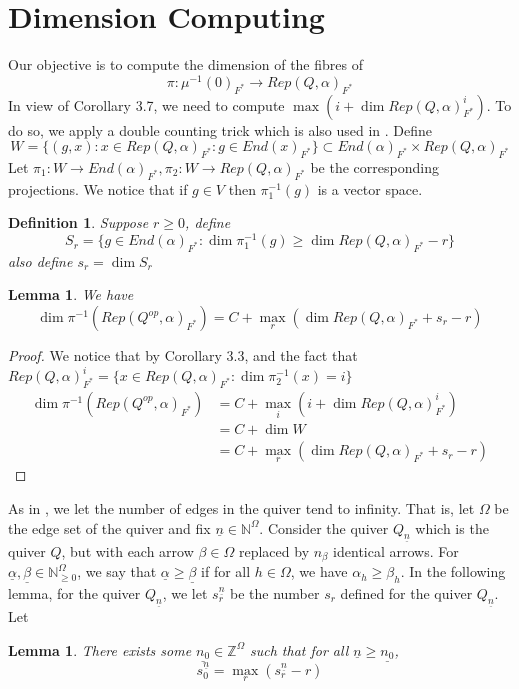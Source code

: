 \documentclass[12pt]{amsart}
\theoremstyle{plain}
\newtheorem{lem}[thm]{Lemma}
\newtheorem{defn}[thm]{Definition}
\theoremstyle{definition}
\theoremstyle{remark}
\begin{document}
\section{Dimension Computing}
\hspace{-12pt}Our objective is to compute the dimension of the fibres of 
$$\pi:\mu^{-1}(0)_{F^*}\to Rep(Q,\alpha)_{F^*}$$
In view of Corollary 3.7, we need to compute $\max(i+\dim Rep(Q,\alpha)^i_{F^*})$. To do so, we apply a double counting trick which is also used in \cite{kac1983root}.
Define 
$$W=\{(g,x):x\in Rep(Q,\alpha)_{F^*}:g\in End(x)_{F^*}\}\subset End(\alpha)_{F^*}\times Rep(Q,\alpha)_{F^*}$$
Let $\pi_1:W\to End(\alpha)_{F^*},\pi_2:W\to Rep(Q,\alpha)_{F^*}$ be the corresponding projections. We notice that if $g\in V$ then $\pi_1^{-1}(g)$ is a vector space.
\begin{defn} Suppose $r\geq 0$, define 
$$S_r=\{g\in End(\alpha)_{F^*}:\dim\pi_1^{-1}(g)\geq \dim Rep(Q,\alpha)_{F^*}-r\}$$
also define $s_r=\dim S_r$
\end{defn}
\begin{lem} We have 
$$\dim{\pi}^{-1}(Rep(Q^{op},\alpha)_{F^*})=C+\max_r(\dim Rep(Q,\alpha)_{F^*}+s_r-r)$$
\end{lem}
\begin{proof}
We notice that by Corollary 3.3, and the fact that $ Rep(Q,\alpha)^i_{F^*}=\{x\in Rep(Q,\alpha)_{F^*}:\dim\pi_2^{-1}(x)=i\}$
\begin{align*}
    \dim\pi^{-1}(Rep(Q^{op},\alpha)_{F^*})&=C+\max_i(i+\dim Rep(Q,\alpha)_{F^*}^i)\\
    &=C+\dim W\\
    &=C+\max_r(\dim Rep(Q,\alpha)_{F^*}+s_r-r)
\end{align*} 
\end{proof}
\hspace{-12pt}As in \cite{hennecart2021asymptotic}, we let the number of edges in the quiver tend to infinity. That is, let $\Omega$ be the edge set of the quiver and fix $\underline{n}\in \mathbb N^{\Omega}$. Consider the quiver $Q_{\underline{n}}$ which is the quiver $Q$, but with each arrow $\beta\in \Omega$ replaced by $n_{\beta}$ identical arrows. For $\underline{\alpha},\underline{\beta}\in\mathbb N_{\geq 0}^{\Omega}$, we say that $\underline{\alpha}\geq\underline{\beta}$ if for all $h\in \Omega$, we have $\alpha_h\geq\beta_h$. In the following lemma, for the quiver $Q_{\underline{n}}$, we let $s_r^{\underline{n}}$ be the number $s_r$ defined for the quiver $Q_{\underline{n}}$. Let 
\begin{lem} There exists some $\underline{n_0}\in\mathbb Z^{\Omega}$ such that for all $\underline{n}\geq\underline{n_0}$,
$$s_0^{\underline{n}}=\max_{r}(s_r^{\underline{n}}-r)$$
\end{lem}
\end{document}
